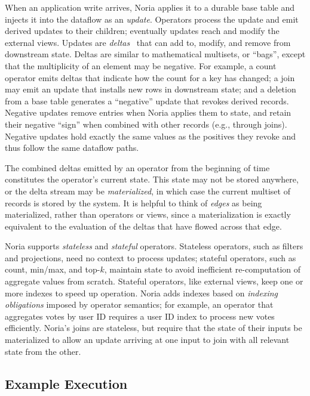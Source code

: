 When an application write arrives, Noria applies it to a durable base table and
injects it into the dataflow as an \emph{update}. Operators process the update
and emit derived updates to their children; eventually updates reach and modify
the external views. Updates are \emph{deltas}~\cite{roll, differential-dataflow}
that can add to, modify, and remove from downstream state. Deltas are similar to
mathematical multisets, or ``bags'', except that the multiplicity of an element
may be negative. For example, a count operator emits deltas that indicate how
the count for a key has changed; a join may emit an update that installs new
rows in downstream state; and a deletion from a base table generates a
``negative'' update that revokes derived records. Negative updates remove
entries when Noria applies them to state, and retain their negative ``sign''
when combined with other records (e.g., through joins). Negative updates hold
exactly the same values as the positives they revoke and thus follow the same
dataflow paths.

The combined deltas emitted by an operator from the beginning of time
constitutes the operator's current state. This state may not be stored anywhere,
or the delta stream may be \textit{materialized}, in which case the current
multiset of records is stored by the system. It is helpful to think of
\emph{edges} as being materialized, rather than operators or views, since a
materialization is exactly equivalent to the evaluation of the deltas that have
flowed across that edge.

Noria supports \emph{stateless} and \emph{stateful} operators. Stateless
operators, such as filters and projections, need no context to process updates;
stateful operators, such as count, min/max, and top-$k$, maintain state to avoid
inefficient re-computation of aggregate values from scratch. Stateful operators,
like external views, keep one or more indexes to speed up operation. Noria adds
indexes based on \emph{indexing obligations} imposed by operator semantics; for
example, an operator that aggregates votes by user ID requires a user ID index
to process new votes efficiently. Noria's joins are stateless, but require that
the state of their inputs be materialized to allow an update arriving at one
input to join with all relevant state from the other.

\subsection{Example Execution}

